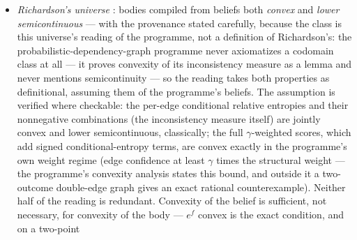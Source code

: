 \begin{remark}
\begin{itemize}
{  embedding} $\mu \mapsto \min_{\nu \in M} \mathrm{KL}(\mu \,\|\,
  \nu)$, the graded reading of the same set: zero exactly on $M$,
  relative-entropy-graded off it --- the set-valued extension of
  the Gibbs chart of the grades paragraph above, with the direction
  of the divergence \emph{forced} rather than chosen: under the
  epistemology's multiplicative-weight update
  \cite{dalrymple26imprecise} (add the expected
  surprisal $E_{\mu}(-\log L)$, renormalize), the wall reading can
  only delete states, the reversed-divergence reading collapses to
  the vacuous belief, while the Hausdorff--KL reading conditions
  each member and charges it the surprisal of its own marginal
  likelihood --- likelihood updating of weighted sets of
  probabilities in the sense of Halpern and Leung \cite{halpern13},
  whose zero set is the maximum-likelihood update of Gilboa and
  Schmeidler \cite{gilboa93} (Dempster conditioning, on
  belief-function credal sets), and whose graded part retains
  exactly the marginal-likelihood record that element-wise
  conditioning \cite{cozman00} forgets (kernel-checked at the
  finite stratum, including the failure of the element-wise square:
  \texttt{SuFunctor.Universe.HausdorffKL});
\item \emph{Richardson's universe} \cite{richardson20}: bodies
  compiled from beliefs both \emph{convex} and
  \emph{lower semicontinuous} --- with the provenance stated
  carefully, because the class is this universe's reading of the
  programme, not a definition of Richardson's: the
  probabilistic-dependency-graph programme never axiomatizes a
  codomain class at all --- it proves convexity of its inconsistency
  measure as a lemma and never mentions semicontinuity --- so the
  reading takes both properties as definitional, assuming them of
  the programme's beliefs. The assumption is verified
  where checkable: the per-edge conditional relative entropies and
  their nonnegative combinations (the inconsistency measure itself)
  are jointly convex and lower semicontinuous, classically; the full
  $\gamma$-weighted scores, which add signed conditional-entropy
  terms, are convex exactly in the programme's own weight regime
  (edge confidence at least $\gamma$ times the structural weight ---
  the programme's convexity analysis states this bound, and outside
  it a two-outcome double-edge graph gives an exact rational
  counterexample). Neither half of the reading is redundant.
  Convexity of the belief is sufficient, not necessary, for
  convexity of the body
  --- $e^{f}$ convex is the exact condition, and on a two-point

\end{itemize}
\end{remark}
